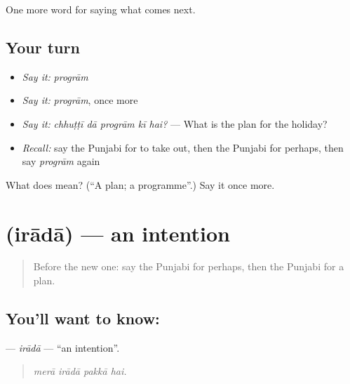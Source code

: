 \begin{grammarlens}[title={What you've built}]
One more word for saying what comes next.
\end{grammarlens}

\subsection*{Your turn}
\begin{itemize}
\raggedright
  \item \emph{Say it:} \emph{progrām}
  \item \emph{Say it:} \emph{progrām}, once more
  \item \emph{Say it:} \emph{chhuṭṭī dā progrām kī hai?} — What is the plan for the holiday?
  \item \emph{Recall:} say the Punjabi for to take out, then the Punjabi for perhaps, then say \emph{progrām} again
\end{itemize}

\begin{tcolorbox}[breakable,colback=teal!4,colframe=teal!35!black,title={Before you move on}]
What does  mean? (\textquotedblleft{}A plan; a programme\textquotedblright{}.) Say it once more.
\end{tcolorbox}
\section[\texorpdfstring{\pa{ਇਰਾਦਾ} (irādā)}{ਇਰਾਦਾ (irādā)}]{ (irādā) — an intention}

\label{lesson:PA-C281-irada}



\begin{quote}
Before the new one: say the Punjabi for perhaps, then the Punjabi for a plan.
\end{quote}

\subsection*{You'll want to know: }
\textbf{} — \emph{irādā} — \textquotedblleft{}an intention\textquotedblright{}.

\begin{quote}
   
\end{quote}

\begin{quote}
\emph{merā irādā pakkā hai.}
\end{quote}

